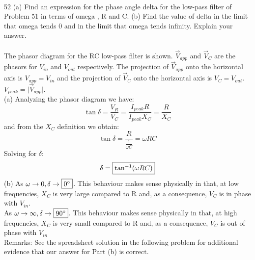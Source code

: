 \documentclass{report}
\begin{document}
\paragraph{} 
52 (a) Find an expression for the phase angle delta for the low-pass filter of Problem 51 in terms of omega , R and C. (b) Find the value of delta in the limit that omega tends 0 and in the limit that omega tends infinity. Explain your answer.\\
\\
The phasor diagram for the RC low-pass filter is shown. $\vec V_{app}$ and $\vec V_C$ are the phasors for $V_{in}$ and $V_{out}$ respectively. The projection of $\vec V_{app}$ onto the horizontal axis is $V_{app} = V_{in}$ and the projection of $\vec V_C$ onto the horizontal axis is $V_C = V_{out}$. $V_{peak} = \lvert \vec V_{app} \rvert$.\\
(a) Analyzing the phasor diagram we have:
$$\tan \delta = \frac{V_R}{V_C} = \frac{I_{peak}R}{I_{peak}X_C} = \frac{R}{X_C}$$
and from the $X_C$ definition we obtain:
$$\tan \delta = \frac{R}{\frac{1}{\omega C}} = \omega RC$$
Solving for $\delta$:
$$\delta = \fbox{$\tan^{-1}(\omega RC)$}$$
(b) As $\omega \rightarrow 0, \delta \rightarrow \fbox{$0^{\circ}$}$. This behaviour makes sense physically in that, at low frequencies, $X_C$ is very large compared to R and, as a consequence, $V_C$ is in phase with $V_{in}$.\\
As $\omega \rightarrow \infty, \delta \rightarrow \fbox{$90^{\circ}$}$. This behaviour makes sense physically in that, at high frequencies, $X_C$ is very small compared to R and, as a consequence, $V_C$ is out of phase with $V_{in}$\\
Remarks: See the spreadsheet solution in the following problem for additional evidence that our answer for Part (b) is correct.
\end{document}
